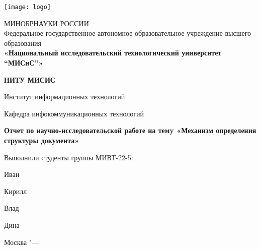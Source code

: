 \thispagestyle{empty}

\begin{center}
      \texttt{[image: logo]}
\end{center}
\begin{center}
МИНОБРНАУКИ РОССИИ \\
\smallskip
Федеральное государственное автономное образовательное учреждение
высшего образования
\\
\textbf{«Национальный исследовательский технологический университет “МИСиС”»}
\bigskip

\textbf{\Large НИТУ МИСИС}

\noindent\hrulefill

\smallskip

Институт информационных технологий

Кафедра инфокоммуникационных технологий
\end{center}
%

\vspace{0pt plus1fill} %
\begin{center}
\textbf {\large %
Отчет по научно-исследовательской работе на темy «Механизм определения структуры документа»}
\end{center}
\vspace{0pt plus2fill} %
Выполнили студенты группы МИВТ-22-5:

 Иван

 Кирилл

 Влад

 Дина

\vspace{0pt plus4fill} %
{\centering Москва "--- \thesisYear\par}
